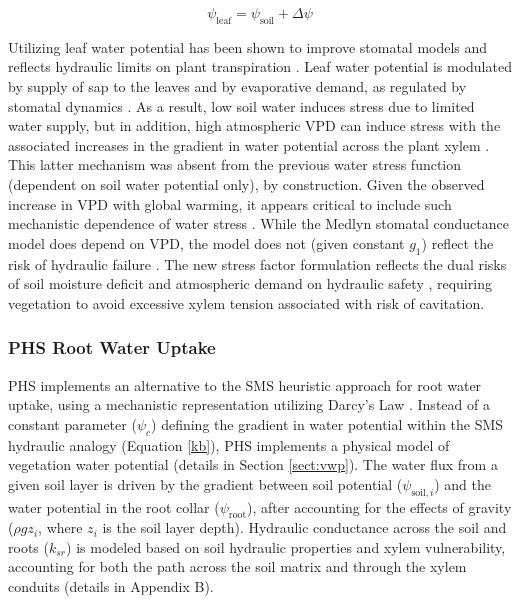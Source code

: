 \documentclass[draft,linenumbers]{agujournal}
\begin{document}
        \begin{linenomath*}
    \begin{equation}
\psi_{\text{leaf}} = \psi_{\text{soil}} + \Delta\psi
    \label{eq:fwphs}
    \end{equation}
    \end{linenomath*}
    
    Utilizing leaf water potential has been shown to improve stomatal models \citep{anderegg2017} and reflects hydraulic limits on plant transpiration \citep{manzoni2013,sperry1998}.
    Leaf water potential is modulated by supply of sap to the leaves and by evaporative demand, as regulated by stomatal dynamics \citep{sperry2015}. 
    As a result, low soil water  induces stress due to limited water supply, but in addition, high atmospheric VPD can induce stress with the associated increases in the gradient in water potential across the plant xylem . 
    This latter mechanism was absent from the previous water stress function (dependent on soil water potential only), by construction.
    Given the observed increase in VPD with global warming, it appears critical to include such mechanistic dependence of water stress \citep{novick2016b}.
    While the Medlyn stomatal conductance model does depend on VPD, the model does not (given constant $g_1$) reflect the risk of hydraulic failure \citep{zhou2013}.
    The new stress factor formulation reflects the dual risks of soil moisture deficit and atmospheric demand on hydraulic safety \citep{williams2013}, requiring vegetation to avoid excessive xylem tension associated with risk of cavitation.

    \subsubsection{PHS Root Water Uptake}
        \label{sect:phsrwu}
    
    PHS implements an alternative to the SMS heuristic approach for root water uptake, using a mechanistic representation utilizing Darcy's Law .
    Instead of a constant parameter ($\psi_c$) defining the gradient in water potential within the SMS hydraulic analogy (Equation \ref{kb}), PHS implements a physical model of vegetation water potential (details in Section \ref{sect:vwp}).
    The water flux from a given soil layer is driven by the gradient between soil potential ($\psi_{\text{soil},i}$) and the water potential in the root collar ($\psi_{\text{root}}$), 
    after accounting for the effects of gravity ($\rho g z_i$, where $z_i$ is the soil layer depth).
    Hydraulic conductance across the soil and roots ($k_{sr}$) is modeled based on soil hydraulic properties and xylem vulnerability, 
    accounting for both the path across the soil matrix and through the xylem conduits (details in Appendix B).
    
\end{document}
